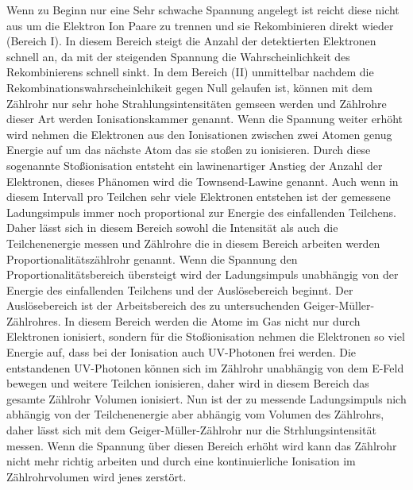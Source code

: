 Wenn zu Beginn nur eine Sehr schwache Spannung angelegt ist reicht diese nicht aus um die Elektron Ion Paare zu trennen und sie Rekombinieren direkt wieder (Bereich I).
In diesem Bereich steigt die Anzahl der detektierten Elektronen schnell an, da mit der steigenden Spannung die Wahrscheinlichkeit des Rekombinierens schnell sinkt.
In dem Bereich (II) unmittelbar nachdem die Rekombinationswahrscheinlchikeit gegen Null gelaufen ist, können mit dem Zählrohr nur sehr hohe Strahlungsintensitäten gemseen werden und Zählrohre dieser Art werden Ionisationskammer genannt.
Wenn die Spannung weiter erhöht wird nehmen die Elektronen aus den Ionisationen zwischen zwei Atomen genug Energie auf um das nächste Atom das sie stoßen zu ionisieren.
Durch diese sogenannte Stoßionisation entsteht ein lawinenartiger Anstieg der Anzahl der Elektronen, dieses Phänomen wird die Townsend-Lawine genannt.
Auch wenn in diesem Intervall pro Teilchen sehr viele Elektronen entstehen ist der gemessene Ladungsimpuls immer noch proportional zur Energie des einfallenden Teilchens.
Daher lässt sich in diesem Bereich sowohl die Intensität als auch die Teilchenenergie messen und Zählrohre die in diesem Bereich arbeiten werden Proportionalitätszählrohr genannt.
Wenn die Spannung den Proportionalitätsbereich übersteigt wird der Ladungsimpuls unabhängig von der Energie des einfallenden Teilchens und der Auslösebereich beginnt.
Der Auslösebereich ist der Arbeitsbereich des zu untersuchenden Geiger-Müller-Zählrohres.
In diesem Bereich werden die Atome im Gas nicht nur durch Elektronen ionisiert, sondern für die Stoßionisation nehmen die Elektronen so viel Energie auf, dass bei der Ionisation auch UV-Photonen frei werden.
Die entstandenen UV-Photonen  können sich im Zählrohr unabhängig von dem E-Feld bewegen und weitere Teilchen ionisieren, daher wird in diesem Bereich das gesamte Zählrohr Volumen ionisiert.
Nun ist der zu messende Ladungsimpuls nich abhängig von der Teilchenenergie aber abhängig vom Volumen des Zählrohrs, daher lässt sich mit dem Geiger-Müller-Zählrohr nur die Strhlungsintensität messen.
Wenn die Spannung über diesen Bereich erhöht wird kann das Zählrohr nicht mehr richtig arbeiten und durch eine kontinuierliche Ionisation im Zählrohrvolumen wird jenes zerstört.
